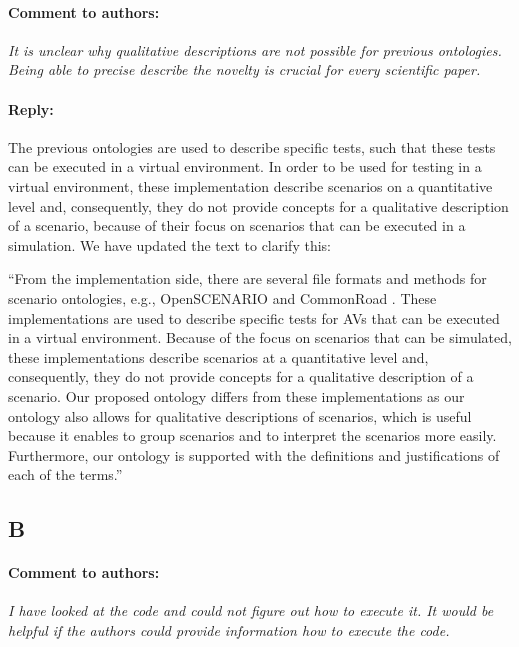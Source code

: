 \documentclass[10pt,final,a4paper,oneside,onecolumn]{article}
\newcommand{\toauthor}{\paragraph*{Comment to authors:} \itshape}
\newcommand{\fromauthor}{\paragraph*{Reply:} \normalfont}
\newcommand{\toauthornew}{\paragraph*{Comment to authors:} \itshape}
\newcommand{\fromauthornew}{\paragraph*{Reply:} \normalfont}
\newcommand{\cstart}{\cbstart\color{red}}
\newcommand{\cend}{\cbend\color{black}}
\begin{document}
\toauthornew It is unclear why qualitative descriptions are not possible for previous ontologies. Being able to precise describe the novelty is crucial for every scientific paper. 

\fromauthornew The previous ontologies are used to describe specific tests, such that these tests can be executed in a virtual environment. In order to be used for testing in a virtual environment, these implementation describe scenarios on a quantitative level and, consequently, they do not provide concepts for a qualitative description of a scenario, because of their focus on scenarios that can be executed in a simulation. We have updated the text to clarify this:

``From the implementation side, there are several file formats and methods for scenario ontologies, e.g., OpenSCENARIO \autocite{openscenario} and CommonRoad \autocite{althoff2017CommonRoad}. 
\cstart These implementations are used to describe specific tests for AVs that can be executed in a virtual environment.
Because of the focus on scenarios that can be simulated, these implementations describe scenarios at a quantitative level and, consequently, they do not provide concepts for a qualitative description of a scenario. \cend
Our proposed ontology differs from these implementations as our ontology also allows for qualitative descriptions of scenarios, which is useful because it enables to group scenarios and to interpret the scenarios more easily.
Furthermore, our ontology is supported with the definitions and justifications of each of the terms.''



\subsection*{B}

%

\toauthornew I have looked at the code and could not figure out how to execute it. It would be helpful if the authors could provide information how to execute the code.
\end{document}
